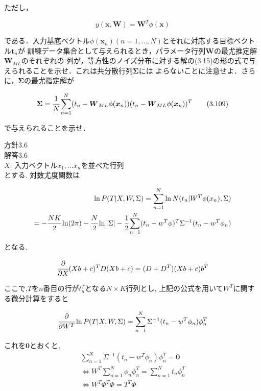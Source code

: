 \documentclass{jsarticle}
\begin{document}
ただし，

\begin{equation}
    y(\boldsymbol{x}, \boldsymbol{W}) = \boldsymbol{W}^T \phi (\boldsymbol{x}) \tag{3.108}
\end{equation}

である．入力基底ベクトル$\phi(\boldsymbol{x}_n) (n=1,\ldots,N)$とそれに対応する目標ベクトル$\boldsymbol{t}_n$が
訓練データ集合として与えられるとき，パラメータ行列$\boldsymbol{W}$の最尤推定解$\boldsymbol{W}_{ML}$のそれぞれの
列が，等方性のノイズ分布に対する解の(3.15)の形の式で与えられることを示せ．これは共分散行列$\boldsymbol{\Sigma}$には
よらないことに注意せよ．さらに，$\boldsymbol{\Sigma}$の最尤指定解が

\begin{equation}
    \boldsymbol{\Sigma} = \cfrac{1}{N} \sum_{n=1}^N (t_n - \boldsymbol{W}_{ML} \phi(\boldsymbol{x}_n))
    (t_n - \boldsymbol{W}_{ML} \phi(\boldsymbol{x}_n))^T \tag{3.109}
\end{equation}

で与えられることを示せ．

方針3.6 \\

解答3.6 \\
\noindent
$X$: 入力ベクトル$x_1, \ldots x_n$を並べた行列 \\
とする.
対数尤度関数は

\begin{align*}
    \ln P(T|X,W,\Sigma)
    = \sum_{n=1}^N \ln N(t_n|W^T\phi(x_n), \Sigma) \\
    = -\cfrac{NK}{2}\ln (2\pi) - \cfrac{N}{2} \ln |\Sigma| - \cfrac{1}{2}\sum_{n=1}^N(t_n - w^T\phi)^T \Sigma^{-1} (t_n-w^T\phi_n)
\end{align*}

となる.

\begin{align*}
    \cfrac{\partial}{\partial X} (Xb + c)^T D (Xb + c) = (D + D^T)(Xb+c)b^T
\end{align*}

ここで,$T$を$n$番目の行が$t_n^T$となる$N \times K$行列とし, 上記の公式を用いて$W^T$に関する微分計算をすると

\begin{align*}
    \cfrac{\partial}{\partial W^T} \ln P(T|X, W, \Sigma)
    = \sum_{n=1}^N \Sigma^{-1}(t_n - w^T\phi_n)\phi_n^T
\end{align*}

これを$\textbf{0}$とおくと, 
\begin{align*}
    \sum_{n=1}^N \Sigma^{-1}(t_n - w^T\phi_n)\phi_n^T
    = \textbf{0} \\
    \Leftrightarrow 
    W^T \sum_{n=1}^N \phi_n \phi_n^T = \sum_{n=1}^N t_n\phi_n^T \\
    \Leftrightarrow W^T \Phi^T \Phi = T^T \Phi \\
\end{align*}
\end{document}
